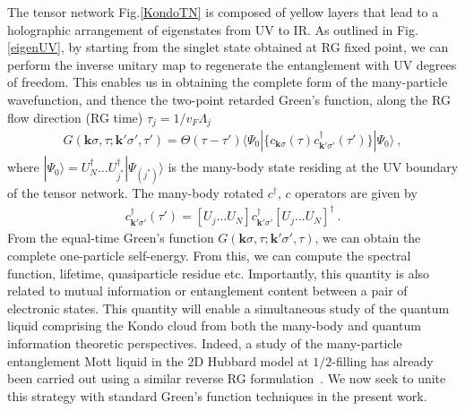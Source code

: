 \documentclass[aps,prl,preprint,groupedaddress]{revtex4-2}
\begin{document}
The tensor network Fig.\ref{KondoTN} is composed of yellow layers that lead to a holographic arrangement of eigenstates from UV to IR. As outlined in Fig.\eqref{eigenUV}, by starting from the singlet state obtained at RG fixed point, we can perform the inverse unitary map to regenerate the entanglement with UV degrees of freedom. This enables us in obtaining the complete form of the many-particle wavefunction, and thence the two-point retarded Green's function, along the RG flow direction (RG time) $\tau_{j}=1/v_{F}\Lambda_{j}$
\begin{eqnarray}
G(\mathbf{k}\sigma,\tau;\mathbf{k}'\sigma',\tau')=\Theta(\tau-\tau')\langle\Psi_{0}|\lbrace c_{\mathbf{k}\sigma}(\tau)c^{\dagger}_{\mathbf{k}'\sigma'}(\tau')\rbrace|\Psi_{0}\rangle~,
\end{eqnarray} 
where $|\Psi_{0}\rangle= U^{\dagger}_{N}\ldots U^{\dagger}_{j^{*}}|\Psi_{(j^{*})}\rangle$ is the many-body state residing at the UV boundary of the tensor network. The many-body rotated $c^{\dagger}$, $c$ operators are given by
\begin{eqnarray}
c^{\dagger}_{\mathbf{k}'\sigma'}(\tau')=[U_{j}\ldots U_{N}]c^{\dagger}_{\mathbf{k}'\sigma'}[U_{j}\ldots U_{N}]^{\dagger}~.
\end{eqnarray}
From the equal-time Green's function $G(\mathbf{k}\sigma,\tau;\mathbf{k}'\sigma',\tau)$, we can obtain the complete one-particle self-energy. From this, we can compute the spectral function, lifetime, quasiparticle residue etc. Importantly, this quantity is also related to mutual information or entanglement content between a pair of electronic states. This quantity will enable a simultaneous study of the quantum liquid comprising the Kondo cloud from both the many-body and quantum information theoretic perspectives. Indeed, a study of the many-particle entanglement Mott liquid in the 2D Hubbard model at $1/2$-filling has already been carried out using a similar reverse RG formulation~\cite{mukherjee2020}. We now seek to unite this strategy with standard Green's function techniques in the present work.
%
\appendix
\end{document}
